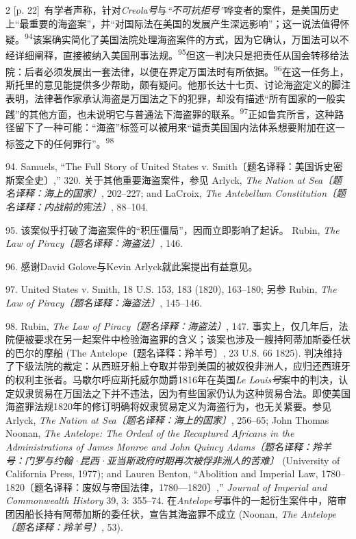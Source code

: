 \documentclass[10pt,a4paper]{article}
\begin{document}
\begin{paracol}{2}
{\scriptsize\color{gray} [p. 22]}\ 有学者声称，针对\textit{Creola号}与\textit{“不可抗拒号”}哗变者的案件，是美国历史上“最重要的海盗案”，并“对国际法在美国的发展产生深远影响”；这一说法值得怀\mbox{疑。\textsuperscript{94}}该案确实简化了美国法院处理海盗案件的方式，因为它确认，万国法可以不经详细阐释，直接被纳入美国刑事法\mbox{规。\textsuperscript{95}}但这一判决只是把责任从国会转移给法院：后者必须发展出一套法律，以便在界定万国法时有所依\mbox{据。\textsuperscript{96}}在这一任务上，斯托里的意见能提供多少帮助，颇有疑问。他那长达十七页、讨论海盗定义的脚注表明，法律著作家承认海盗是万国法之下的犯罪，却没有描述“所有国家的一般实践”的其他方面，也未说明它与普通法下海盗罪的联\mbox{系。\textsuperscript{97}}正如鲁宾所言，这种路径留下了一种可能：“海盗”标签可以被用来“谴责美国国内法体系想要附加在这一标签之下的任何罪行”。\nobreak\textsuperscript{98}\par{\small 94. Samuels, “The Full Story of United States v. Smith〔题名译释：美国诉史密斯案全史〕,” 320. 关于其他重要海盗案件，参见 Arlyck, \textit{The Nation at Sea〔题名译释：海上的国家〕}, 202–227; and LaCroix, \textit{The Antebellum Constitution〔题名译释：内战前的宪法〕}, 88–104.\par}{\small 95. 该案似乎打破了海盗案件的“积压僵局”，因而立即影响了起诉。 Rubin, \textit{The Law of Piracy〔题名译释：海盗法〕}, 146.\par}{\small 96. 感谢David Golove与Kevin Arlyck就此案提出有益意见。\par}{\small 97. United States v. Smith, 18 U.S. 153, 183 (1820), 163–180; 另参 Rubin, \textit{The Law of Piracy〔题名译释：海盗法〕}, 145–146.\par}{\small 98. Rubin, \textit{The Law of Piracy〔题名译释：海盗法〕}, 147. 事实上，仅几年后，法院便被要求在另一起案件中检验海盗罪的含义；该案也涉及一艘持阿蒂加斯委任状的巴尔的摩船 (The Antelope〔题名译释：羚羊号〕, 23 U.S. 66 1825). 判决维持了下级法院的裁定：从西班牙船上夺取并带到美国的被奴役非洲人，应归还西班牙的权利主张者。马歇尔呼应斯托威尔勋爵1816年在英国\textit{Le Louis号}案中的判决，认定奴隶贸易在万国法之下并不违法，因为有些国家仍认为这种贸易合法。即使美国海盗罪法规1820年的修订明确将奴隶贸易定义为海盗行为，也无关紧要。参见 Arlyck, \textit{The Nation at Sea〔题名译释：海上的国家〕}, 256–65; John Thomas Noonan, \textit{The Antelope: The Ordeal of the Recaptured Africans in the Administrations of James Monroe and John Quincy Adams〔题名译释：羚羊号：门罗与约翰·昆西·亚当斯政府时期再次被俘非洲人的苦难〕} (University of California Press, 1977); and Lauren Benton, “Abolition and Imperial Law, 1780–1820〔题名译释：废奴与帝国法律，1780—1820〕,” \textit{Journal of Imperial and Commonwealth History} 39, 3: 355–74. 在\textit{Antelope号}事件的一起衍生案件中，陪审团因船长持有阿蒂加斯的委任状，宣告其海盗罪不成立 (Noonan, \textit{The Antelope〔题名译释：羚羊号〕}, 53).\par}

\end{paracol}
\end{document}
